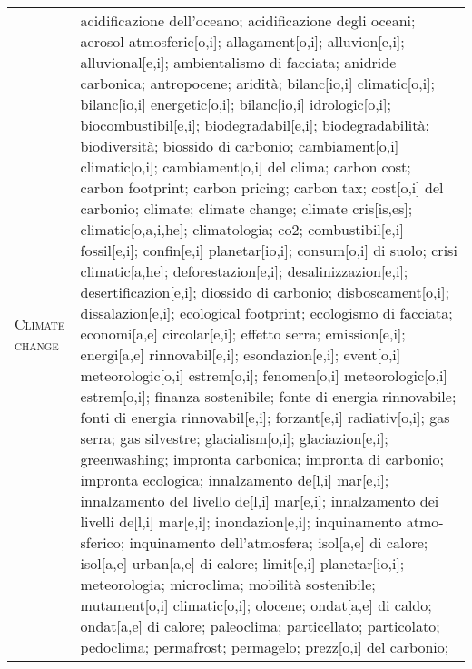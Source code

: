 \begin{table*}
{\begin{tabular}{p{2cm}p{16.5cm}}
        \textsc{Climate change} & 
        acidificazione dell'oceano; 
        acidificazione degli oceani; 
        aerosol atmosferic[o,i]; 
        allagament[o,i]; 
        alluvion[e,i]; 
        alluvional[e,i]; 
        ambientalismo di facciata; 
        anidride carbonica; 
        antropocene; 
        aridità; 
        bilanc[io,i] climatic[o,i]; 
        bilanc[io,i] energetic[o,i]; 
        bilanc[io,i] idrologic[o,i]; 
        biocombustibil[e,i]; 
        biodegradabil[e,i]; 
        biodegradabilità; 
        biodiversità; 
        biossido di carbonio; 
        cambiament[o,i] climatic[o,i]; 
        cambiament[o,i] del clima; 
        carbon cost; 
        carbon footprint; 
        carbon pricing; 
        carbon tax; 
        cost[o,i] del carbonio; 
        climate; 
        climate change; 
        climate cris[is,es]; 
        climatic[o,a,i,he]; 
        climatologia; 
        co2; 
        combustibil[e,i] fossil[e,i]; 
        confin[e,i] planetar[io,i]; 
        consum[o,i] di suolo; 
        crisi climatic[a,he]; 
        deforestazion[e,i]; 
        desalinizzazion[e,i]; 
        desertificazion[e,i]; 
        diossido di carbonio; 
        disboscament[o,i]; 
        dissalazion[e,i]; 
        ecological footprint; 
        ecologismo di facciata; 
        economi[a,e] circolar[e,i]; 
        effetto serra; 
        emission[e,i]; 
        energi[a,e] rinnovabil[e,i]; 
        esondazion[e,i]; 
        event[o,i] meteorologic[o,i] estrem[o,i]; 
        fenomen[o,i] meteorologic[o,i] estrem[o,i]; 
        finanza sostenibile; 
        fonte di energia rinnovabile; 
        fonti di energia rinnovabil[e,i]; 
        forzant[e,i] radiativ[o,i]; 
        gas serra; 
        gas silvestre; 
        glacialism[o,i]; 
        glaciazion[e,i]; 
        greenwashing; 
        impronta carbonica; 
        impronta di carbonio; 
        impronta ecologica; 
        innalzamento de[l,i] mar[e,i]; 
        innalzamento del livello de[l,i] mar[e,i]; 
        innalzamento dei livelli de[l,i] mar[e,i]; 
        inondazion[e,i]; 
        inquinamento atmo-sferico; 
        inquinamento dell'atmosfera; 
        isol[a,e] di calore; 
        isol[a,e] urban[a,e] di calore; 
        limit[e,i] planetar[io,i]; %
        meteorologia; 
        microclima; 
        mobilità sostenibile; 
        mutament[o,i] climatic[o,i]; 
        olocene; 
        ondat[a,e] di caldo; 
        ondat[a,e] di calore; 
        paleoclima; 
        particellato; 
        particolato; 
        pedoclima; 
        permafrost; 
        permagelo; 
        prezz[o,i] del carbonio; 

\end{tabular}}
\end{table*}
